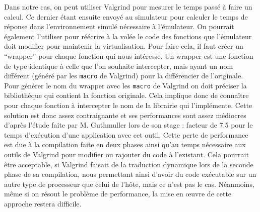 Dans notre cas, on peut utiliser Valgrind pour mesurer le temps passé à faire un
calcul. Ce dernier étant ensuite envoyé au simulateur pour calculer le temps de
réponse dans l'environnement simulé nécessaire à l'émulateur. On pourrait
également l'utiliser pour réécrire à la volée le code des fonctions que
l'émulateur doit modifier pour maintenir la virtualisation. Pour faire cela, il
faut créer un ``wrapper'' pour chaque fonction qui nous intéresse. Un wrapper
est une fonction de type identique à celle que l'on souhaite intercepter, mais
ayant un nom différent (généré par les \texttt{macro} de Valgrind) pour la
différencier de l'originale. Pour générer le nom du wrapper avec
les \texttt{macro} de Valgrind on doit préciser la bibliothèque qui contient la
fonction originale. Cela implique donc de connaître pour chaque fonction à
intercepter le nom de la librairie qui l'implémente. Cette solution est donc
assez contraignante et ses performances sont assez médiocres d'après l'étude
faite par M. Guthmuller lors de son stage \citep{MARION:Interception}: facteur
de 7.5 pour le temps d'exécution d'une application avec cet outil. Cette perte
de performance est due à la compilation faite en deux phases ainsi qu'au temps
nécessaire aux outils de Valgrind pour modifier ou rajouter du code à
l'existant. Cela pourrait être acceptable, si Valgrind faisait de la traduction
dynamique lors de la seconde phase de sa compilation, nous permettant ainsi
d'avoir du code exécutable sur un autre type de processeur que celui de l'hôte,
mais ce n'est pas le cas. Néanmoins, même si on résout le problème de
performance, la mise en \oe uvre de cette approche restera difficile.
